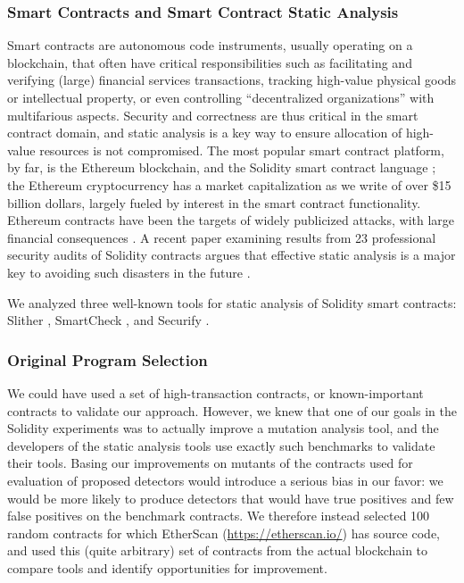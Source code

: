 \subsubsection{Smart Contracts and Smart Contract Static Analysis}

Smart contracts are autonomous code instruments, usually operating on a blockchain, that often have critical responsibilities such as facilitating and verifying (large) financial services transactions, tracking high-value physical goods or intellectual property, or even controlling ``decentralized organizations'' with multifarious aspects.  Security and correctness are thus critical in the smart contract domain, and static analysis is a key way to ensure allocation of high-value resources is not compromised.  The most popular smart contract platform, by far, is the Ethereum blockchain, and the Solidity smart contract language \cite{buterin2013whitepaper,wood2014yellow}; the Ethereum cryptocurrency has a market capitalization as we write of over \$15 billion dollars, largely fueled by interest in the smart contract functionality.  Ethereum contracts have been the targets of widely publicized attacks, with large financial consequences  \cite{spank,DAO}.   A recent paper examining results from 23 professional security audits of Solidity contracts argues that effective static analysis is a major key to avoiding such disasters in the future \cite{FC20}.

We analyzed three well-known tools for static analysis of Solidity smart contracts: Slither \cite{slither}, SmartCheck \cite{smartcheck}, and Securify \cite{Securify}.

\subsubsection{Original Program Selection}

We could have used a set of high-transaction contracts, or known-important contracts to validate our approach.  However, we knew that one of our goals in the Solidity experiments was to actually improve a mutation analysis tool, and the developers of the static analysis tools use exactly such benchmarks to validate their tools.  Basing our improvements on mutants of the contracts used for evaluation of proposed detectors would introduce a serious bias in our favor: we would be more likely to produce detectors that would have true positives and few false positives on the benchmark contracts.  We therefore instead selected 100 random contracts for which EtherScan (\url{https://etherscan.io/}) has source code, and used this (quite arbitrary) set of contracts from the actual blockchain to compare tools and identify opportunities for improvement.

